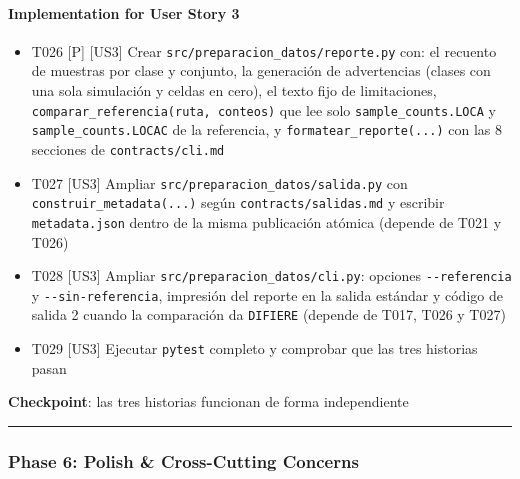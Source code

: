 \documentclass[12pt,a4paper]{article}
\providecommand{\tightlist}{\setlength{\itemsep}{0pt}\setlength{\parskip}{0pt}}
\newenvironment{documentogenerado}[2]{%
  \def\doccomando{#1}\def\docruta{#2}%
  \par\begingroup\small\setstretch{1.15}\sloppy%
}{\endgroup\par\medskip}
\begin{document}
\begin{documentogenerado}{/speckit-tasks (fase 7: /speckit-converge)}{specs\slash 001-preparacion-datos\slash tasks.md}
\paragraph{Implementation for User Story 3}

\begin{itemize}
\tightlist
\item[$\boxtimes$]
  T026 {[}P{]} {[}US3{]} Crear \texttt{src/\allowbreak{}preparacion\_\allowbreak{}datos/\allowbreak{}reporte.\allowbreak{}py} con: el recuento de muestras por clase y conjunto, la generación de advertencias (clases con una sola simulación y celdas en cero), el texto fijo de limitaciones, \texttt{comparar\_\allowbreak{}referencia(ruta,\ conteos)} que lee solo \texttt{sample\_\allowbreak{}counts.\allowbreak{}LOCA} y \texttt{sample\_\allowbreak{}counts.\allowbreak{}LOCAC} de la referencia, y \texttt{formatear\_\allowbreak{}reporte(.\allowbreak{}.\allowbreak{}.\allowbreak{})} con las 8 secciones de \texttt{contracts/\allowbreak{}cli.\allowbreak{}md}
\item[$\boxtimes$]
  T027 {[}US3{]} Ampliar \texttt{src/\allowbreak{}preparacion\_\allowbreak{}datos/\allowbreak{}salida.\allowbreak{}py} con \texttt{construir\_\allowbreak{}metadata(.\allowbreak{}.\allowbreak{}.\allowbreak{})} según \texttt{contracts/\allowbreak{}salidas.\allowbreak{}md} y escribir \texttt{metadata.\allowbreak{}json} dentro de la misma publicación atómica (depende de T021 y T026)
\item[$\boxtimes$]
  T028 {[}US3{]} Ampliar \texttt{src/\allowbreak{}preparacion\_\allowbreak{}datos/\allowbreak{}cli.\allowbreak{}py}: opciones \texttt{-\allowbreak{}\/\allowbreak{}-\allowbreak{}referencia} y \texttt{-\allowbreak{}\/\allowbreak{}-\allowbreak{}sin-\allowbreak{}referencia}, impresión del reporte en la salida estándar y código de salida 2 cuando la comparación da \texttt{DIFIERE} (depende de T017, T026 y T027)
\item[$\boxtimes$]
  T029 {[}US3{]} Ejecutar \texttt{pytest} completo y comprobar que las tres historias pasan
\end{itemize}

\textbf{Checkpoint}: las tres historias funcionan de forma independiente

\begin{center}\rule{0.5\linewidth}{0.5pt}\end{center}

\subsubsection{Phase 6: Polish \& Cross-Cutting Concerns}


\end{documentogenerado}
\end{document}
